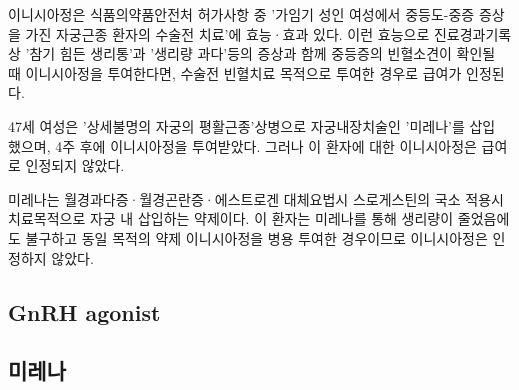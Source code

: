 이니시아정은 식품의약품안전처 허가사항 중 '가임기 성인 여성에서 중등도-중증 증상을 가진 자궁근종 환자의 수술전 치료'에 효능·효과 있다. 이런 효능으로 진료경과기록 상 '참기 힘든 생리통'과 '생리량 과다'등의 증상과 함께 중등증의 빈혈소견이 확인될 때 이니시아정을 투여한다면, 수술전 빈혈치료 목적으로 투여한 경우로 급여가 인정된다.

47세 여성은 '상세불명의 자궁의 평활근종'상병으로 자궁내장치술인 '미레나'를 삽입 했으며, 4주 후에 이니시아정을 투여받았다. 그러나 이 환자에 대한 이니시아정은 급여로 인정되지 않았다.

미레나는 월경과다증·월경곤란증·에스트로겐 대체요법시 스로게스틴의 국소 적용시 치료목적으로 자궁 내 삽입하는 약제이다. 이 환자는 미레나를 통해 생리량이 줄었음에도 불구하고 동일 목적의 약제 이니시아정을 병용 투여한 경우이므로 이니시아정은 인정하지 않았다.
\subsection{GnRH agonist}
\subsection{미레나}